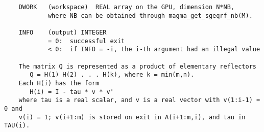 \documentclass[10pt]{book}
\begin{document}
\begin{verbatim}
    DWORK   (workspace)  REAL array on the GPU, dimension N*NB,
            where NB can be obtained through magma_get_sgeqrf_nb(M).

    INFO    (output) INTEGER   
            = 0:  successful exit   
            < 0:  if INFO = -i, the i-th argument had an illegal value   

    The matrix Q is represented as a product of elementary reflectors   
       Q = H(1) H(2) . . . H(k), where k = min(m,n).   
    Each H(i) has the form   
       H(i) = I - tau * v * v'   
    where tau is a real scalar, and v is a real vector with v(1:i-1) = 0 and 
    v(i) = 1; v(i+1:m) is stored on exit in A(i+1:m,i), and tau in TAU(i).   
\end{verbatim}

\newpage
\end{document}
